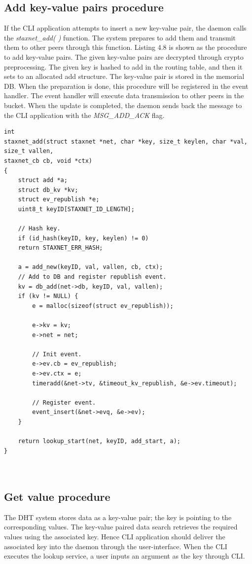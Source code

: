 \subsection{Add key-value pairs procedure}

If the CLI application attempts to insert a new key-value pair, the daemon calls the \textit{staxnet\_add( )} function. The system prepares to add them and transmit them to other peers through this function. Listing 4.8 is shown as the procedure to add key-value pairs. The given key-value pairs are decrypted through crypto preprocessing. The given key is hashed to add in the routing table, and then it sets to an allocated add structure. The key-value pair is stored in the memorial DB. When the preparation is done, this procedure will be registered in the event handler. The event handler will execute data transmission to other peers in the bucket. When the update is completed, the daemon sends back the message to the CLI application with the \textit{MSG\_ADD\_ACK} flag.

\lstset{language=C} 
\begin{lstlisting}[caption=The procedure add key-value pairs]
int
staxnet_add(struct staxnet *net, char *key, size_t keylen, char *val, size_t vallen, 
staxnet_cb cb, void *ctx)
{
	struct add *a;
	struct db_kv *kv;
	struct ev_republish *e;
	uint8_t keyID[STAXNET_ID_LENGTH];
	
	// Hash key.
	if (id_hash(keyID, key, keylen) != 0)
	return STAXNET_ERR_HASH;
	
	a = add_new(keyID, val, vallen, cb, ctx);
	// Add to DB and register republish event.
	kv = db_add(net->db, keyID, val, vallen);
	if (kv != NULL) {
		e = malloc(sizeof(struct ev_republish));
		
		e->kv = kv;
		e->net = net;
		
		// Init event.
		e->ev.cb = ev_republish;
		e->ev.ctx = e;
		timeradd(&net->tv, &timeout_kv_republish, &e->ev.timeout);
		
		// Register event.
		event_insert(&net->evq, &e->ev);
	} 
	
	return lookup_start(net, keyID, add_start, a);
}

	
\end{lstlisting}

\subsection{Get value procedure}

The DHT system stores data as a key-value pair; the key is pointing to the corresponding values. The key-value paired data search retrieves the required values using the associated key. Hence CLI application should deliver the associated key into the daemon through the user-interface. When the CLI executes the lookup service, a user inputs an argument as the key through CLI.

